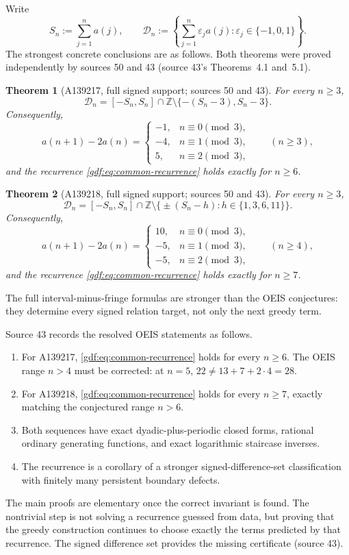 \documentclass[11pt,a4paper]{article}
\numberwithin{equation}{section}
\newtheorem{theorem}{Theorem}[section]
\theoremstyle{definition}
\theoremstyle{remark}
\theoremstyle{plain}
\newcommand{\Z}{\mathbb Z}
\newcommand{\cD}{\mathcal D}
\newcommand{\src}[1]{\textup{(source #1)}}
\begin{document}
Write
\[
 S_n:=\sum_{j=1}^n a(j),\qquad
 \cD_n:=\left\{\sum_{j=1}^n\varepsilon_j a(j):
          \varepsilon_j\in\{-1,0,1\}\right\}.
\]
The strongest concrete conclusions are as follows.  Both theorems were proved
independently by sources 50 and 43 (source 43's Theorems~4.1 and~5.1).

\begin{theorem}[A139217, full signed support; sources 50 and 43]\label{gdf:thm:intro-217}
For every $n\ge3$,
\[
 \cD_n=[-S_n,S_n]\cap\Z\setminus\{-(S_n-3),S_n-3\}.
\]
Consequently,
\[
 a(n+1)-2a(n)=
 \begin{cases}
 -1,&n\equiv0\pmod3,\\
 -4,&n\equiv1\pmod3,\\
  5,&n\equiv2\pmod3,
 \end{cases}
 \qquad(n\ge3),
\]
and the recurrence \eqref{gdf:eq:common-recurrence} holds exactly for $n\ge6$.
\end{theorem}

\begin{theorem}[A139218, full signed support; sources 50 and 43]\label{gdf:thm:intro-218}
For every $n\ge3$,
\[
 \cD_n=[-S_n,S_n]\cap\Z\setminus
 \bigl\{\pm(S_n-h):h\in\{1,3,6,11\}\bigr\}.
\]
Consequently,
\[
 a(n+1)-2a(n)=
 \begin{cases}
 10,&n\equiv0\pmod3,\\
 -5,&n\equiv1\pmod3,\\
 -5,&n\equiv2\pmod3,
 \end{cases}
 \qquad(n\ge4),
\]
and the recurrence \eqref{gdf:eq:common-recurrence} holds exactly for $n\ge7$.
\end{theorem}

The full interval-minus-fringe formulas are stronger than the OEIS
conjectures: they determine every signed relation target, not only the next
greedy term.

Source 43 records the resolved OEIS statements as follows.
\begin{enumerate}[label=(\arabic*)]
\item For A139217, \eqref{gdf:eq:common-recurrence} holds for every $n\ge6$.
      The OEIS range $n>4$ must be corrected: at $n=5$,
      $22\ne13+7+2\cdot4=28$.
\item For A139218, \eqref{gdf:eq:common-recurrence} holds for every $n\ge7$,
      exactly matching the conjectured range $n>6$.
\item Both sequences have exact dyadic-plus-periodic closed forms, rational
      ordinary generating functions, and exact logarithmic staircase inverses.
\item The recurrence is a corollary of a stronger signed-difference-set
      classification with finitely many persistent boundary defects.
\end{enumerate}
The main proofs are elementary once the correct invariant is found.  The
nontrivial step is not solving a recurrence guessed from data, but proving that
the greedy construction continues to choose exactly the terms predicted by
that recurrence.  The signed difference set provides the missing certificate
\src{43}.
\end{document}

